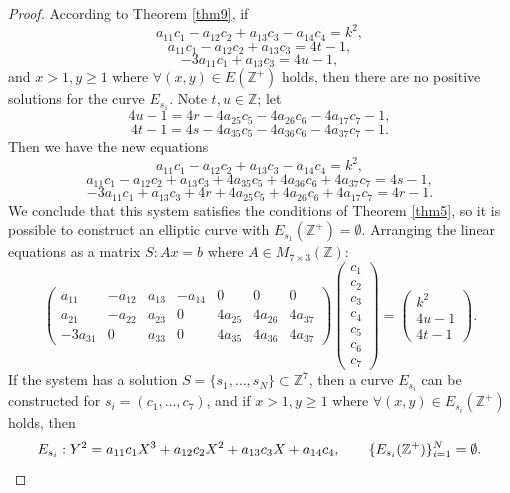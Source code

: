\documentclass[11pt]{amsart}
\begin{document}
\begin{proof}
According to Theorem \ref{thm9}, if
\[
a_{11}c_1-a_{12}c_2+a_{13}c_3-a_{14}c_4=k^2,
\]
\[
a_{11}c_1-a_{12}c_2+a_{13}c_3=4t-1,
\]
\[
-3a_{11}c_1+a_{13}c_3=4u-1,
\]
and $x>1,y\ge1$ where $\forall(x,y)\in E(\mathbb{Z}^+)$ holds, then there are no positive solutions for the curve $E_{s_1}$. Note $t,u\in\mathbb{Z}$; let
\[
4u-1 = 4r-4a_{25}c_5-4a_{26}c_6-4a_{17}c_7-1,
\]
\[
4t-1 = 4s-4a_{35}c_5-4a_{36}c_6-4a_{37}c_7-1.
\]
Then we have the new equations
\[
a_{11}c_1-a_{12}c_2+a_{13}c_3-a_{14}c_4=k^2,
\]
\[
a_{11}c_1-a_{12}c_2+a_{13}c_3+4a_{35}c_5+4a_{36}c_6+4a_{37}c_7=4s-1,
\]
\[
-3a_{11}c_1+a_{13}c_3+4r+4a_{25}c_5+4a_{26}c_6+4a_{17}c_7=4r-1.
\]
We conclude that this system satisfies the conditions of Theorem \ref{thm5}, so it is possible to construct an elliptic curve with $E_{s_1}(\mathbb{Z}^+)=\emptyset$. Arranging the linear equations as a matrix $S: Ax=b$ where $A\in M_{7\times3}(\mathbb{Z})$:
\[
\begin{pmatrix}
a_{11}&-a_{12}&a_{13}&-a_{14}&0&0&0\\
a_{21}&-a_{22}&a_{23}&0&4a_{25}&4a_{26}&4a_{37}\\
-3a_{31}&0&a_{33}&0&4a_{35}&4a_{36}&4a_{37}
\end{pmatrix}
\begin{pmatrix}c_1\\c_2\\c_3\\c_4\\c_5\\c_6\\c_7\end{pmatrix}
=\begin{pmatrix}k^2\\4u-1\\4t-1\end{pmatrix}.
\]
If the system has a solution $S=\{s_1,\dots,s_N\}\subset\mathbb{Z}^7$, then a curve $E_{s_i}$ can be constructed for $s_i=(c_1,\dots,c_7)$, and if $x>1,y\ge1$ where $\forall(x,y)\in E_{s_i}(\mathbb{Z}^+)$ holds, then
\[
E_{s_i}: Y^2=a_{11}c_1X^3+a_{12}c_2X^2+a_{13}c_3X+a_{14}c_4, \qquad \{E_{s_i}(\mathbb{Z}^+)\}_{i=1}^N=\emptyset. \qedhere
\]
\end{proof}
\end{document}
